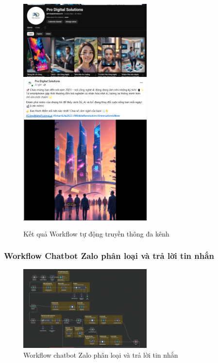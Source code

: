 \begin{figure}[H]
    \centering
    \includegraphics[width=0.6\textwidth]{img/Picture13.png}
    \includegraphics[width=0.6\textwidth]{img/Picture14.png}
    \caption{Kết quả Workflow tự động truyền thông đa kênh}
    \label{fig:workflow-ketqua}
\end{figure}

\subsubsection{Workflow Chatbot Zalo phân loại và trả lời tin nhắn}

\begin{figure}[H]
    \centering
    \includegraphics[width=0.6\textwidth]{img/Picture15.png}
    \caption{Workflow chatbot Zalo phân loại và trả lời tin nhắn}
    \label{fig:chatbot-phanloai}
\end{figure}

